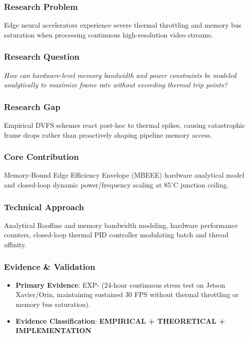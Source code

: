 \documentclass[11pt,letterpaper]{article}
\begin{document}
\subsubsection{Research Problem}
Edge neural accelerators experience severe thermal throttling and memory bus saturation when processing continuous high-\allowbreak resolution video streams.

\subsubsection{Research Question}
\begin{tcolorbox}[colback=blue!3!white,colframe=blue!50!black,title=Primary Scientific Question]
\textit{How can hardware-\allowbreak level memory bandwidth and power constraints be modeled analytically to maximize frame rate without exceeding thermal trip points?}
\end{tcolorbox}

\subsubsection{Research Gap}
Empirical DVFS schemes react post-\allowbreak hoc to thermal spikes, causing catastrophic frame drops rather than proactively shaping pipeline memory access.

\subsubsection{Core Contribution}
Memory-\allowbreak Bound Edge Efficiency Envelope (MBEEE) hardware analytical model and closed-\allowbreak loop dynamic power/\allowbreak frequency scaling at $85^\circ\text{C}$ junction ceiling.

\subsubsection{Technical Approach}
Analytical Roofline and memory bandwidth modeling, hardware performance counters, closed-\allowbreak loop thermal PID controller modulating batch and thread affinity.

\subsubsection{Evidence \& Validation}
\begin{itemize}[leftmargin=*]
    \item \textbf{Primary Evidence}: EXP- (24-\allowbreak hour continuous stress test on Jetson Xavier/\allowbreak Orin, maintaining sustained 30 FPS without thermal throttling or memory bus saturation).
    \item \textbf{Evidence Classification}: \textbf{EMPIRICAL + THEORETICAL + IMPLEMENTATION}
\end{itemize}
\end{document}
